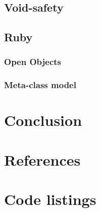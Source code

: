 \documentclass[12pt,a4paper,twocolumn]{article}
\begin{document}
\subsection{Void-safety}


\subsection{Ruby}
\subsubsection{Open Objects}
\subsubsection{Meta-class model}

\section{Conclusion}
\section{References}
\newpage
\section{Code listings}










\end{document}
